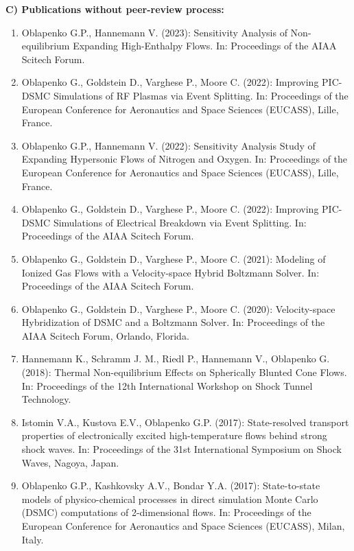 \documentclass{resume} %
\begin{document}
{\bf C) Publications without peer-review process:}
\begin{enumerate}

    
    \item {Oblapenko G.P., Hannemann V.} (2023): Sensitivity Analysis of Non-equilibrium Expanding High-Enthalpy Flows. In: Proceedings of the AIAA Scitech Forum.

    \item {Oblapenko G., Goldstein D., Varghese P., Moore C.} (2022): Improving PIC-DSMC Simulations of RF Plasmas via Event Splitting. In: Proceedings of the European Conference for Aeronautics and Space Sciences (EUCASS), Lille, France.

    \item {Oblapenko G.P., Hannemann V.} (2022): Sensitivity Analysis Study of Expanding Hypersonic Flows of Nitrogen and Oxygen. In: Proceedings of the European Conference for Aeronautics and Space Sciences (EUCASS), Lille, France.

    \item {Oblapenko G., Goldstein D., Varghese P., Moore C.} (2022): Improving PIC-DSMC Simulations of Electrical Breakdown via Event Splitting. In: Proceedings of the AIAA Scitech Forum.
    
    \item {Oblapenko G., Goldstein D., Varghese P., Moore C.} (2021): Modeling of Ionized Gas Flows with a Velocity-space Hybrid Boltzmann Solver. In: Proceedings of the AIAA Scitech Forum.
    
    \item {Oblapenko G., Goldstein D., Varghese P., Moore C.} (2020): Velocity-space Hybridization of DSMC and a Boltzmann Solver. In: Proceedings of the AIAA Scitech Forum, Orlando, Florida.

    \item {Hannemann K., Schramm J. M., Riedl P., Hannemann V., { Oblapenko G.}} (2018): Thermal Non-equilibrium Effects on Spherically Blunted Cone Flows. In: Proceedings of the 12th International Workshop on Shock Tunnel Technology.
    
    \item Istomin V.A., Kustova E.V., {Oblapenko G.P.} (2017): State-resolved transport properties of electronically excited high-temperature flows behind strong shock waves. In: Proceedings of the 31st International Symposium on Shock Waves, Nagoya, Japan.
    
    \item {{Oblapenko G.P.}, Kashkovsky A.V., Bondar Y.A.} (2017): State-to-state models of physico-chemical processes in direct simulation Monte Carlo (DSMC) computations of 2-dimensional flows. In: Proceedings of the European Conference for Aeronautics and Space Sciences (EUCASS), Milan, Italy.


\end{enumerate}
\end{document}
